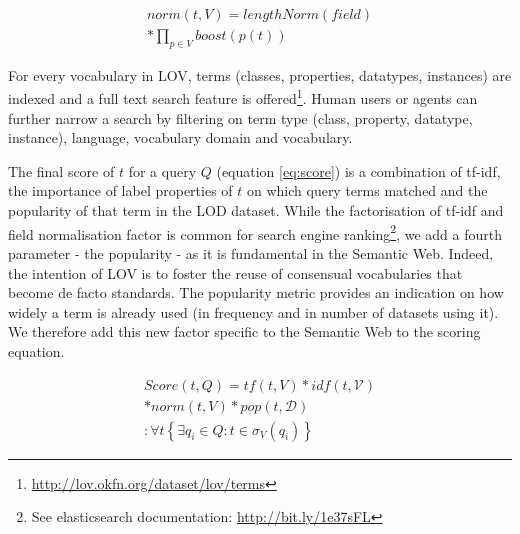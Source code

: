 \documentclass{iosart2c}
\begin{document}
\begin{equation}\label{eq:norm}
\begin{split}
norm(t,V) =  lengthNorm(field) \\
* \prod_{p \in V} boost(p(t))
\end{split}
\end{equation}

For every vocabulary in LOV, terms (classes, properties, datatypes, instances) are indexed and a full text search feature is offered\footnote{\url{http://lov.okfn.org/dataset/lov/terms}}. Human users or agents can further narrow a search by filtering on term type (class, property, datatype, instance), language, vocabulary domain and vocabulary.

The final score of $t$ for a query $Q$ (equation \ref{eq:score}) is a combination of tf-idf, the importance of label properties of $t$ on which query terms matched and the popularity of that term in the LOD dataset. While the factorisation of tf-idf and field normalisation factor is common for search engine ranking\footnote{See elasticsearch documentation: \url{http://bit.ly/1e37sFL}}, we add a fourth parameter - the popularity - as it is fundamental in the Semantic Web. Indeed, the intention of LOV is to foster the reuse of consensual vocabularies that become de facto standards. The popularity metric provides an indication on how widely a term is already used (in frequency and in number of datasets using it). We therefore add this new factor specific to the Semantic Web to the scoring equation.
 

\begin{equation}\label{eq:score}
\begin{split}
Score(t,Q) =tf(t,V) * idf(t,\mathcal{V}) \\
* norm(t,V) * pop(t,\mathcal{D})\\
: \forall t\left\{\exists q_i \in Q: t \in \sigma_V(q_i)\right\}
\end{split}
\end{equation}
\end{document}
